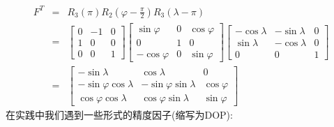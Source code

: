 		\begin{equation}\label{eq:9.29}
		\begin{array}{rcl}

			F^T &=& R_3(\pi)R_2(\varphi-\frac{\pi}{2})R_3(\lambda-\pi) \\

				&=&\begin{bmatrix}

						0 & -1 & 0 \\

						1 &  0 & 0 \\

						0 &  0 & 1

					\end{bmatrix}

					\begin{bmatrix}

					\sin \varphi & 0 & \cos \varphi \\

					0 & 1 & 0 \\

					-\cos \varphi& 0 & \sin \varphi

					\end{bmatrix}

					\begin{bmatrix}

					-\cos \lambda & -\sin \lambda & 0 \\

					\sin \lambda & -\cos \lambda & 0 \\

					0 & 			0 & 1 

					\end{bmatrix} \\

				 &=&\begin{bmatrix}

					-\sin \lambda & \cos \lambda & 0 \\

					-\sin \varphi \cos \lambda & -\sin \varphi \sin \lambda & \cos \varphi \\

					\cos \varphi \cos \lambda & \cos \varphi \sin \lambda & \sin \varphi 

					\end{bmatrix}
		\end{array}	
		\end{equation}
	在实践中我们遇到一些形式的精度因子(缩写为DOP):


